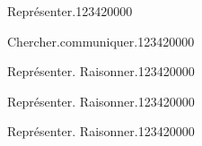 \begin{pageParcoursd} 
 
\begin{ExoCd}{Représenter.}{1234}{2}{0}{0}{0}{0}


 
\end{ExoCd}

 
\begin{ExoCd}{Chercher.communiquer.}{1234}{2}{0}{0}{0}{0}



\end{ExoCd}


\begin{ExoCd}{Représenter. Raisonner.}{1234}{2}{0}{0}{0}{0}


\end{ExoCd}

\begin{ExoCd}{Représenter. Raisonner.}{1234}{2}{0}{0}{0}{0}


\end{ExoCd}
 
\begin{ExoCd}{Représenter. Raisonner.}{1234}{2}{0}{0}{0}{0}


\end{ExoCd}
 
\end{pageParcoursd}

